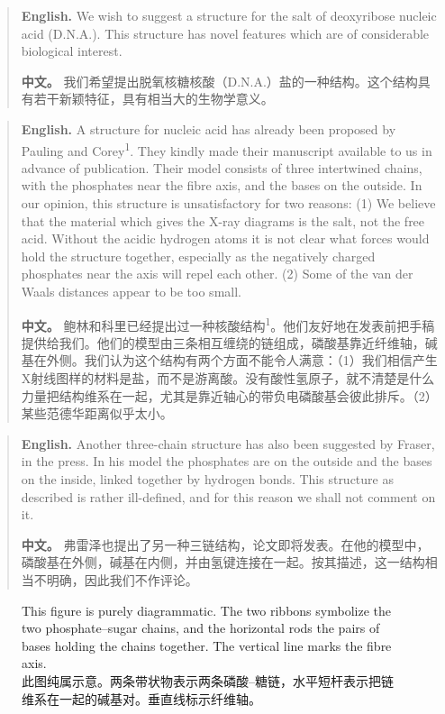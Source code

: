 \begin{quote}
\noindent\textbf{English.} We wish to suggest a structure for the salt of deoxyribose nucleic acid (D.N.A.). This structure has novel features which are of considerable biological interest.

\smallskip
\noindent\textbf{中文。} 我们希望提出脱氧核糖核酸（D.N.A.）盐的一种结构。这个结构具有若干新颖特征，具有相当大的生物学意义。
\end{quote}

\begin{quote}
\noindent\textbf{English.} A structure for nucleic acid has already been proposed by Pauling and Corey\textsuperscript{1}. They kindly made their manuscript available to us in advance of publication. Their model consists of three intertwined chains, with the phosphates near the fibre axis, and the bases on the outside. In our opinion, this structure is unsatisfactory for two reasons: (1) We believe that the material which gives the X-ray diagrams is the salt, not the free acid. Without the acidic hydrogen atoms it is not clear what forces would hold the structure together, especially as the negatively charged phosphates near the axis will repel each other. (2) Some of the van der Waals distances appear to be too small.

\smallskip
\noindent\textbf{中文。} 鲍林和科里已经提出过一种核酸结构\textsuperscript{1}。他们友好地在发表前把手稿提供给我们。他们的模型由三条相互缠绕的链组成，磷酸基靠近纤维轴，碱基在外侧。我们认为这个结构有两个方面不能令人满意：（1）我们相信产生X射线图样的材料是盐，而不是游离酸。没有酸性氢原子，就不清楚是什么力量把结构维系在一起，尤其是靠近轴心的带负电磷酸基会彼此排斥。（2）某些范德华距离似乎太小。
\end{quote}

\begin{quote}
\noindent\textbf{English.} Another three-chain structure has also been suggested by Fraser, in the press. In his model the phosphates are on the outside and the bases on the inside, linked together by hydrogen bonds. This structure as described is rather ill-defined, and for this reason we shall not comment on it.

\smallskip
\noindent\textbf{中文。} 弗雷泽也提出了另一种三链结构，论文即将发表。在他的模型中，磷酸基在外侧，碱基在内侧，并由氢键连接在一起。按其描述，这一结构相当不明确，因此我们不作评论。
\end{quote}

\begin{figure}[htbp]
\centering
{}
\caption{This figure is purely diagrammatic. The two ribbons symbolize the two phosphate--sugar chains, and the horizontal rods the pairs of bases holding the chains together. The vertical line marks the fibre axis.\\此图纯属示意。两条带状物表示两条磷酸--糖链，水平短杆表示把链维系在一起的碱基对。垂直线标示纤维轴。}
\end{figure}

